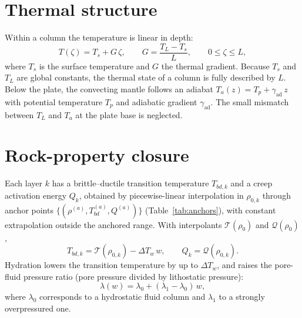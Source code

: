 \documentclass[11pt]{article}
\begin{document}
\section{Thermal structure}
\label{sec:thermal}

Within a column the temperature is linear in depth:
\begin{equation}
  T(\zeta) = T_s + G\,\zeta, \qquad
  G = \frac{T_L - T_s}{L}, \qquad 0 \le \zeta \le L,
  \label{eq:geotherm}
\end{equation}
where $T_s$ is the surface temperature and $G$ the thermal gradient. Because
$T_s$ and $T_L$ are global constants, the thermal state of a column is fully
described by $L$. Below the plate, the convecting mantle follows an adiabat
$T_a(z) = T_p + \gamma_{\mathrm{ad}}\,z$ with potential temperature $T_p$ and
adiabatic gradient $\gamma_{\mathrm{ad}}$. The small mismatch between $T_L$ and
$T_a$ at the plate base is neglected.

\section{Rock-property closure}
\label{sec:closure}

Each layer $k$ has a brittle--ductile transition temperature $T_{bd,k}$ and a
creep activation energy $Q_k$, obtained by piecewise-linear interpolation in
$\rho_{0,k}$ through anchor points $\{(\rho^{(a)}, T_{bd}^{(a)}, Q^{(a)})\}$
(Table~\ref{tab:anchors}), with constant extrapolation outside the anchored
range. With interpolants $\mathcal{T}(\rho_0)$ and $\mathcal{Q}(\rho_0)$,
\begin{equation}
  T_{bd,k} = \mathcal{T}(\rho_{0,k}) - \Delta T_w\, w,
  \qquad
  Q_k = \mathcal{Q}(\rho_{0,k}).
  \label{eq:Tbd}
\end{equation}
Hydration lowers the transition temperature by up to $\Delta T_w$, and raises the
pore-fluid pressure ratio (pore pressure divided by lithostatic pressure):
\begin{equation}
  \lambda(w) = \lambda_0 + (\lambda_1 - \lambda_0)\, w,
  \label{eq:lambda}
\end{equation}
where $\lambda_0$ corresponds to a hydrostatic fluid column and $\lambda_1$ to a
strongly overpressured one.
\end{document}
